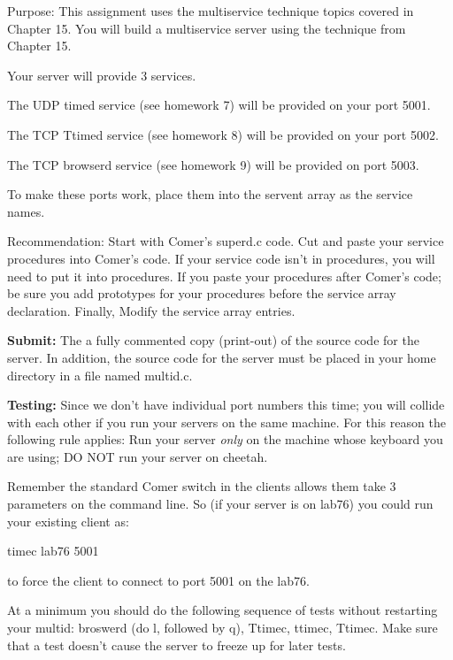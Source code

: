 

\parindent 0pt

Purpose: This assignment uses the multiservice technique
topics covered in Chapter 15.
You will build a multiservice server
using the technique from Chapter 15.

Your server will provide 3 services.

The UDP {\ltt{}timed} service (see homework 7) will be provided
on your port 5001.

The TCP {\ltt{}Ttimed} service (see homework 8) will be provided
on your port 5002.

The TCP {\ltt{}browserd} service (see homework 9) will be provided
on port 5003.

To make these ports work, place them into the {\ltt{}servent} array
as the service names.

Recommendation: Start with Comer's {\ltt{}superd.c} code.
Cut and paste your service procedures into Comer's code.
If your service code isn't in procedures, you will need to put it 
into procedures.
If you paste your procedures after Comer's code; be sure you
add prototypes for your procedures before the service array declaration.
Finally, Modify the service array entries.

{\bf Submit:} The a fully commented copy (print-out) of the source code for the 
server.
In addition,
the source code for the server must be placed in your home directory
in a file named {\ltt{}multid.c}.

{\bf Testing:}
Since we don't have individual port numbers this time; you will
collide with each other if you run your servers on the same machine.
For this reason the following rule applies:
Run your server {\it only} on the machine whose keyboard you are using;
DO NOT run your server on {\ltt{}cheetah}.

Remember the standard Comer switch in the clients allows them
take 3 parameters on the command line.
So (if your server is on {\ltt{}lab76}) you could run your existing client as:

{\ltt{}timec lab76 5001}

to force the client to connect to port 5001 on the lab76. 

At a  minimum you should do the following sequence of tests
without restarting your multid: broswerd (do l, followed by q), Ttimec,
ttimec, Ttimec.
Make sure that a test doesn't cause the server to freeze up for later tests.

\bye

